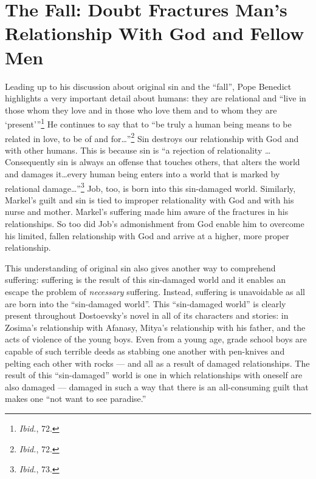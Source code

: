 \section{The Fall: Doubt Fractures Man's Relationship With God and Fellow Men}
Leading up to his discussion about original sin and the ``fall'', Pope Benedict highlights a very important detail about humans: they are relational and ``live in those whom they love and in those who love them and to whom they are `present'\thinspace''\footnote{\emph{Ibid.}, 72.} He continues to say that to ``be truly a human being means to be related in love, to be of and for\ldots''\footnote{\emph{Ibid.}, 72.} Sin destroys our relationship with God and with other humans. This is because sin is ``a rejection of relationality \ldots Consequently sin is always an offense that touches others, that alters the world and damages it\ldots every human being enters into a world that is marked by relational damage\ldots''\footnote{\emph{Ibid.}, 73.} Job, too, is born into this sin-damaged world. Similarly, Markel's guilt and sin is tied to improper relationality with God and with his nurse and mother. Markel's suffering made him aware of the fractures in his relationships. So too did Job's admonishment from God enable him to overcome his limited, fallen relationship with God and arrive at a higher, more proper relationship. 

This understanding of original sin also gives another way to comprehend suffering: suffering is the result of this sin-damaged world and it enables an escape the problem of \emph{necessary} suffering. Instead, suffering is unavoidable as all are born into the ``sin-damaged world''. This ``sin-damaged world'' is clearly present throughout Dostoevsky's novel in all of its characters and stories: in Zosima's relationship with Afanasy, Mitya's relationship with his father, and the acts of violence of the young boys. Even from a young age, grade school boys are capable of such terrible deeds as stabbing one another with pen-knives and pelting each other with rocks --- and all as a result of damaged relationships. The result of this ``sin-damaged'' world is one in which relationships with oneself are also damaged --- damaged in such a way that there is an all-consuming guilt that makes one ``not want to see paradise.''

